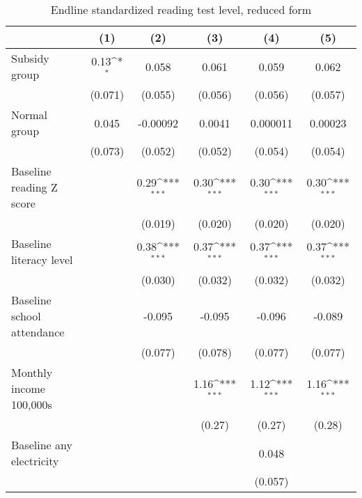 \begin{table}[htbp]\centering
\def\sym#1{\ifmmode^{#1}\else\(^{#1}\)\fi}
\caption{Endline standardized reading test level, reduced form}
\begin{tabular*}{1\hsize}{@{\hskip\tabcolsep\extracolsep\fill}l*{5}{c}}
\toprule
                &\multicolumn{1}{c}{(1)}         &\multicolumn{1}{c}{(2)}         &\multicolumn{1}{c}{(3)}         &\multicolumn{1}{c}{(4)}         &\multicolumn{1}{c}{(5)}         \\
\midrule
Subsidy group   &     0.13\sym{*}  &    0.058         &    0.061         &    0.059         &    0.062         \\
                &  (0.071)         &  (0.055)         &  (0.056)         &  (0.056)         &  (0.057)         \\
Normal group    &    0.045         & -0.00092         &   0.0041         & 0.000011         &  0.00023         \\
                &  (0.073)         &  (0.052)         &  (0.052)         &  (0.054)         &  (0.054)         \\
Baseline reading Z score&                  &     0.29\sym{***}&     0.30\sym{***}&     0.30\sym{***}&     0.30\sym{***}\\
                &                  &  (0.019)         &  (0.020)         &  (0.020)         &  (0.020)         \\
Baseline literacy level&                  &     0.38\sym{***}&     0.37\sym{***}&     0.37\sym{***}&     0.37\sym{***}\\
                &                  &  (0.030)         &  (0.032)         &  (0.032)         &  (0.032)         \\
Baseline school attendance&                  &   -0.095         &   -0.095         &   -0.096         &   -0.089         \\
                &                  &  (0.077)         &  (0.078)         &  (0.077)         &  (0.077)         \\
Monthly income 100,000s&                  &                  &     1.16\sym{***}&     1.12\sym{***}&     1.16\sym{***}\\
                &                  &                  &   (0.27)         &   (0.27)         &   (0.28)         \\
Baseline any electricity&                  &                  &                  &    0.048         &                  \\
                &                  &                  &                  &  (0.057)         &                  \\

\end{tabular*}
\end{table}

